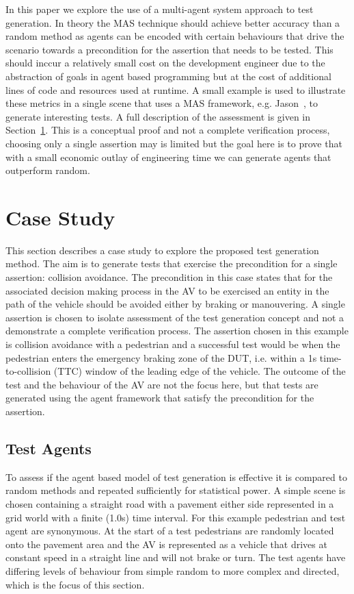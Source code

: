 \documentclass[letterpaper, 10 pt, journal, twoside]{IEEEtran}
\begin{document}
In this paper we explore the use of a multi-agent system approach to test generation. In theory the MAS technique should achieve better accuracy than a random method as agents can be encoded with certain behaviours that drive the scenario towards a precondition for the assertion that needs to be tested. 
%
This should inccur a relatively small cost on the development engineer due to the abstraction of goals in agent based programming but at the cost of additional lines of code and resources used at runtime. 
%
A small example is used to illustrate these metrics in a single scene that uses a MAS framework, e.g. Jason~\cite{bordini2005jason}, to generate interesting tests. A full description of the assessment is given in Section~\ref{CaseStudy}. 
%
This is a conceptual proof and not a complete verification process, choosing only a single assertion may is limited but the goal here is to prove that with a small economic outlay of engineering time we can generate agents that outperform random. 




\section{Case Study} \label{CaseStudy}
 
This section describes a case study to explore the proposed test generation method. The aim is to generate tests that exercise the precondition for a single assertion: collision avoidance. The precondition in this case states that for the associated decision making process in the AV to be exercised an entity in the path of the vehicle should be avoided either by braking or manouvering.  A single assertion is chosen to isolate assessment of the test generation concept and not a demonstrate a complete verification process. The assertion chosen in this example is collision avoidance with a pedestrian and a successful test would be when the pedestrian enters the emergency braking zone of the DUT, i.e. within a 1s time-to-collision (TTC) window of the leading edge of the vehicle. The outcome of the test and the behaviour of the AV are not the focus here, but that tests are generated using the agent framework that satisfy the precondition for the assertion. 

\subsection{Test Agents}
To assess if the agent based model of test generation is effective it is compared to random methods and repeated sufficiently for statistical power. A simple scene is chosen containing a straight road with a pavement either side represented in a grid world with a finite (1.0s) time interval. For this example pedestrian and test agent are synonymous. At the start of a test pedestrians are randomly located onto the pavement area and the AV is represented as a vehicle that drives at constant speed in a straight line and will not brake or turn. The test agents have differing levels of behaviour from simple random to more complex and directed, which is the focus of this section. 
\end{document}
